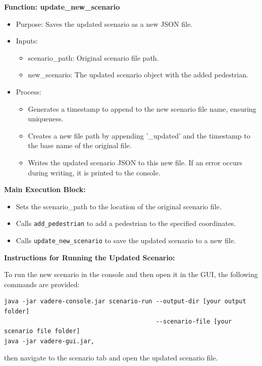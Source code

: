 \textbf{Function: update\_new\_scenario}

\begin{itemize}
    \item Purpose: Saves the updated scenario as a new JSON file.
    \item Inputs:
    \begin{itemize}
       \item scenario\_path: Original scenario file path.
        \item new\_scenario: The updated scenario object with the added pedestrian.
    \end{itemize} 
    \item Process:
    \begin{itemize}
        \item Generates a timestamp to append to the new scenario file name, ensuring uniqueness.
        \item Creates a new file path by appending '\_updated' and the timestamp to the base name of the original file.
        \item Writes the updated scenario JSON to this new file. If an error occurs during writing, it is printed to the console.
    \end{itemize}
\end{itemize}


\textbf{Main Execution Block:}
\begin{itemize}
    \item Sets the scenario\_path to the location of the original scenario file.
    \item Calls \texttt{add\_pedestrian} to add a pedestrian to the specified coordinates.
    \item Calls \texttt{update\_new\_scenario} to save the updated scenario to a new file.
\end{itemize}

\textbf{Instructions for Running the Updated Scenario:}

To run the new scenario in the console and then open it in the GUI, the following commands are provided:
\begin{verbatim}
java -jar vadere-console.jar scenario-run --output-dir [your output folder] 
                                          --scenario-file [your scenario file folder]
java -jar vadere-gui.jar, \end{verbatim}
then navigate to the scenario tab and open the updated scenario file.\\

